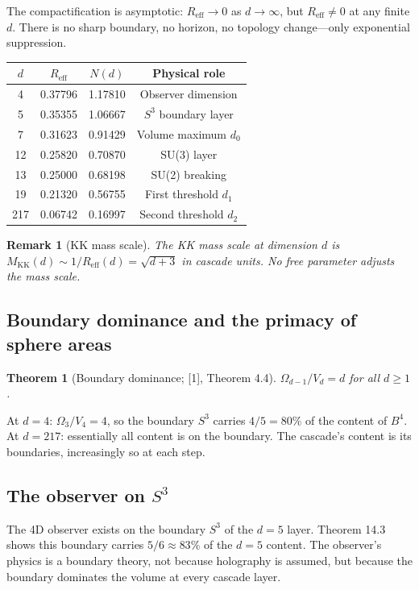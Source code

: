 \documentclass[12pt,a4paper]{article}
\newtheorem{theorem}{Theorem}[section]
\newtheorem*{remark}{Remark}
\begin{document}
The compactification is asymptotic: $R_{\text{eff}} \to 0$ as $d \to \infty$, but $R_{\text{eff}} \neq 0$ at any finite $d$.
There is no sharp boundary, no horizon, no topology change---only exponential suppression.

\begin{center}
\begin{tabular}{cccc}
\hline
$d$ & $R_{\text{eff}}$ & $N(d)$ & Physical role \\
\hline
4 & 0.37796 & 1.17810 & Observer dimension \\
5 & 0.35355 & 1.06667 & $S^3$ boundary layer \\
7 & 0.31623 & 0.91429 & Volume maximum $d_0$ \\
12 & 0.25820 & 0.70870 & SU(3) layer \\
13 & 0.25000 & 0.68198 & SU(2) breaking \\
19 & 0.21320 & 0.56755 & First threshold $d_1$ \\
217 & 0.06742 & 0.16997 & Second threshold $d_2$ \\
\hline
\end{tabular}
\end{center}

\begin{remark}[KK mass scale]
The KK mass scale at dimension $d$ is $M_{\text{KK}}(d) \sim
1/R_{\text{eff}}(d) = \sqrt{d + 3}$ in cascade units. No free parameter adjusts the mass scale.
\end{remark}

\subsection{Boundary dominance and the primacy of sphere areas}

\begin{theorem}[Boundary dominance; {[1]}, Theorem 4.4]
$\Omega_{d-1}/V_d = d$ for all $d \geq 1$.
\end{theorem}

At $d = 4$: $\Omega_3/V_4 = 4$, so the boundary $S^3$ carries $4/5 = 80\%$ of the content of $B^4$. At
$d = 217$: essentially all content is on the boundary. The cascade's content is its boundaries,
increasingly so at each step.

\subsection{The observer on \texorpdfstring{$S^3$}{S\^{}3}}

The 4D observer exists on the boundary $S^3$ of the $d = 5$ layer. Theorem 14.3 shows this
boundary carries $5/6 \approx 83\%$ of the $d = 5$ content. The observer's physics is a boundary
theory, not because holography is assumed, but because the boundary dominates the
volume at every cascade layer.
\end{document}
